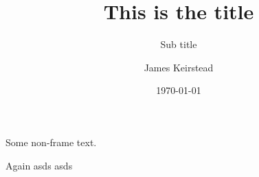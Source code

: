
\title{This is the title}
\subtitle{Sub title}
\date{\today}
\author{James Keirstead}



\begin{frame}
\maketitle
\end{frame}

Some non-frame text.
\begin{frame}{Again}
asds \pause
asds
\end{frame}


